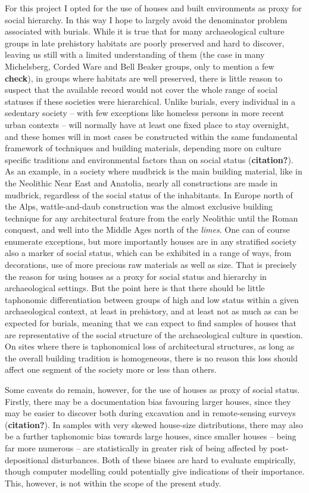 \documentclass[
  12pt,
]{book}
\begin{document}
For this project I opted for the use of houses and built environments as proxy for social hierarchy. In this way I hope to largely avoid the denominator problem associated with burials. While it is true that for many archaeological culture groups in late prehistory habitats are poorly preserved and hard to discover, leaving us still with a limited understanding of them (the case in many Michelsberg, Corded Ware and Bell Beaker groups, only to mention a few \textbf{check}), in groups where habitats are well preserved, there is little reason to suspect that the available record would not cover the whole range of social statuses if these societies were hierarchical. Unlike burials, every individual in a sedentary society -- with few exceptions like homeless persons in more recent urban contexts -- will normally have at least one fixed place to stay overnight, and these homes will in most cases be constructed within the same fundamental framework of techniques and building materials, depending more on culture specific traditions and environmental factors than on social status (\textbf{citation?}). As an example, in a society where mudbrick is the main building material, like in the Neolithic Near East and Anatolia, nearly all constructions are made in mudbrick, regardless of the social status of the inhabitants. In Europe north of the Alps, wattle-and-daub construction was the almost exclusive building technique for any architectural feature from the early Neolithic until the Roman conquest, and well into the Middle Ages north of the \emph{limes}. One can of course enumerate exceptions, but more importantly houses are in any stratified society also a marker of social status, which can be exhibited in a range of ways, from decorations, use of more precious raw materials as well as size. That is precisely the reason for using houses as a proxy for social status and hierarchy in archaeological settings. But the point here is that there should be little taphonomic differentiation between groups of high and low status within a given archaeological context, at least in prehistory, and at least not as much as can be expected for burials, meaning that we can expect to find samples of houses that are representative of the social structure of the archaeological culture in question. On sites where there is taphonomical loss of architectural structures, as long as the overall building tradition is homogeneous, there is no reason this loss should affect one segment of the society more or less than others.

Some caveats do remain, however, for the use of houses as proxy of social status. Firstly, there may be a documentation bias favouring larger houses, since they may be easier to discover both during excavation and in remote-sensing surveys (\textbf{citation?}). In samples with very skewed house-size distributions, there may also be a further taphonomic bias towards large houses, since smaller houses -- being far more numerous -- are statistically in greater risk of being affected by post-depositional disturbances. Both of these biases are hard to evaluate empirically, though computer modelling could potentially give indications of their importance. This, however, is not within the scope of the present study.
\end{document}
